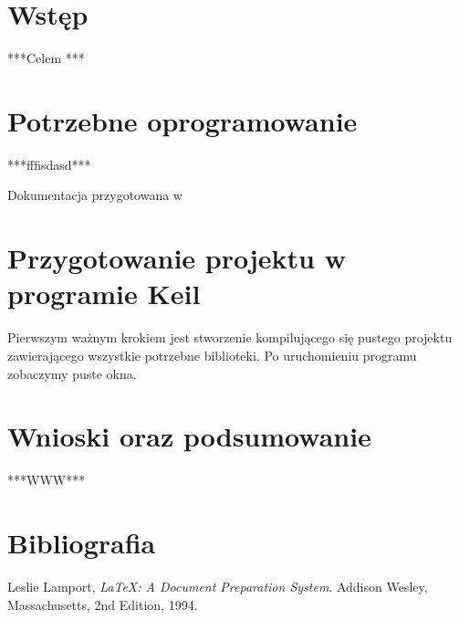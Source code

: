 \documentclass[12pt,a4paper]{mwart}
\begin{document}
	
	

	\title{}
	\author{Paweł Szwagierek\\
	Wydział Elektroniki,\\
	Politechnika Wrocławska,\\
	Nr Albumu: 184763\\
	\texttt{184763@student.pwr.wroc.pl}
	}
	\date{\today}
	\maketitle
	\tableofcontents
	\clearpage

	\section{Wstęp}
	***Celem ***

	\section{Potrzebne oprogramowanie}
	***fffisdasd***

	Dokumentacja przygotowana w \LaTeXe

	\section{Przygotowanie projektu w programie Keil}
	Pierwszym ważnym krokiem jest stworzenie kompilującego się pustego projektu zawierającego wszystkie potrzebne biblioteki. Po uruchomieniu programu zobaczymy puste okna.

	\section{Wnioski oraz podsumowanie}
	***WWW***
	\section{Bibliografia}
	\begin{thebibliography}{9}


	Leslie Lamport,
	\emph{\LaTeX: A Document Preparation System}.
	Addison Wesley, Massachusetts,
	2nd Edition,
	1994.

	\end{thebibliography} %
\end{document}
